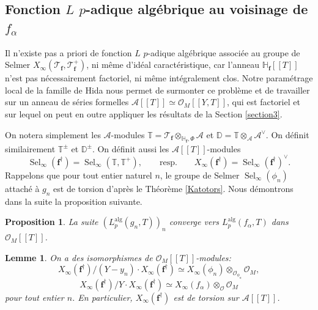 \documentclass[12pt]{amsart}
\newcommand\bD{\mathbb{D}}
\newcommand\bH{\mathbb{H}}
\newcommand\bT{\mathbb{T}}
\newcommand\cA{\mathcal{A}}
\newcommand\cO{\mathcal{O}}
\newcommand\cT{\mathcal{T}}
\newcommand{\alg}{\textrm{alg}}
\DeclareMathOperator{\Sel}{Sel}
\theoremstyle{defstyle}
\theoremstyle{thmstyle}
\newtheorem{proposition}[subsubsection]{Proposition}
\newtheorem{lemme}[subsubsection]{Lemme}
\begin{document}
\subsection{Fonction $L$ $p$-adique algébrique au voisinage de $f_\alpha$}\label{para_alg}
Il n'existe pas a priori de fonction $L$ $p$-adique algébrique associée au groupe de Selmer $X_\infty(\cT_\textbf{f},\cT_\textbf{f}^+)$, ni même d'idéal caractéristique, car l'anneau $\bH_\textbf{f}[[T]]$ n'est pas nécessairement factoriel, ni même intégralement clos. Notre paramétrage local de la famille de Hida nous permet de surmonter ce problème et de travailler sur un anneau de séries formelles $\cA[[T]]\simeq \cO_M[[Y,T]]$, qui est factoriel et sur lequel on peut en outre appliquer les résultats de la Section \ref{section3}. 


On notera simplement les $\cA$-modules $\bT = \cT_\textbf{f} \otimes_{\bH_\textbf{f},\Phi} \cA$ et $\bD=\bT \otimes_{\cA} \cA^\vee$. On définit similairement $\bT^\pm$ et $\bD^\pm$. On définit aussi les $\cA[[T]]$-modules 
$$\Sel_\infty(\textbf{f}^\dag) = \Sel_\infty(\bT,\bT^+), \qquad \textrm{resp.} \qquad X_\infty(\textbf{f}^\dag) = \Sel_\infty(\textbf{f}^\dag)^\vee.$$
Rappelons que pour tout entier naturel $n$, le groupe de Selmer $\Sel_\infty(\phi_n)$ attaché à $g_n$ est de torsion d'après le Théorème \ref{Katotors}. Nous démontrons dans la suite la proposition suivante.

\begin{proposition}\label{an}
	La suite $(L_p^{\alg}(g_n,T))_n$ converge vers $L_p^{\alg}(f_\alpha,T)$ dans $\cO_M[[T]]$.
\end{proposition}

\begin{lemme}\label{spécialisation_torsion}
	On a des isomorphismes de $\cO_M[[T]]$-modules:
	\[
	X_\infty(\textbf{f}^\dag)/\left(Y-y_n\right)\cdot X_\infty(\textbf{f}^\dag) \simeq X_\infty(\phi_n) \otimes_{\cO_{\phi_n}} \cO_M, \]\[ X_\infty(\textbf{f}^\dag)/Y\cdot X_\infty(\textbf{f}^\dag) \simeq X_{\infty}(f_\alpha) \otimes_{\cO} \cO_M
	\]
	pour tout entier $n$. En particulier, $X_\infty(\textbf{f}^\dag)$ est de torsion sur $\cA[[T]]$.
\end{lemme}
\end{document}
